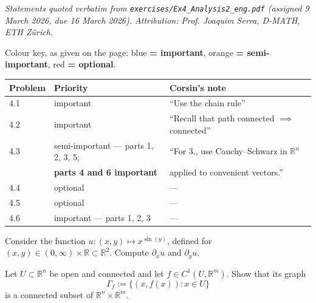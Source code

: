 
\textit{Statements quoted verbatim from \texttt{exercises/Ex4\_Analysis2\_eng.pdf} (assigned 9
March 2026, due 16 March 2026). Attribution: Prof. Joaquim Serra, D-MATH, ETH Z\"urich.}

\begin{notation}
Colour key, as given on the page: blue \textbf{= important}, orange \textbf{= semi-important},
red \textbf{= optional}.

\begin{center}
\begin{tabular}{lll}
\textbf{Problem} & \textbf{Priority} & \textbf{Corsin's note} \\
\hline
4.1 & important & ``Use the chain rule'' \\
4.2 & important & ``Recall that path connected $\implies$ connected'' \\
4.3 & semi-important --- parts 1, 2, 3, 5; & ``For 3., use Cauchy--Schwarz in $\mathbb{R}^n$ \\
    & \textbf{parts 4 and 6 important} & applied to convenient vectors.'' \\
4.4 & optional & --- \\
4.5 & optional & --- \\
4.6 & important --- parts 1, 2, 3 & --- \\
\end{tabular}
\end{center}
\end{notation}

\begin{exercise}
\label{ex:4.1}
Consider the function $u : (x,y) \mapsto x^{\sin(y)}$, defined for
$(x,y) \in (0,\infty)\times\mathbb{R} \subset \mathbb{R}^2$. Compute $\partial_x u$ and
$\partial_y u$.
\end{exercise}

\begin{exercise}
\label{ex:4.2}
Let $U \subset \mathbb{R}^n$ be open and connected and let $f \in C^1(U, \mathbb{R}^m)$. Show that
its graph
$$\Gamma_f := \{(x, f(x)) : x \in U\}$$
is a connected subset of $\mathbb{R}^n \times \mathbb{R}^m$.
\end{exercise}

